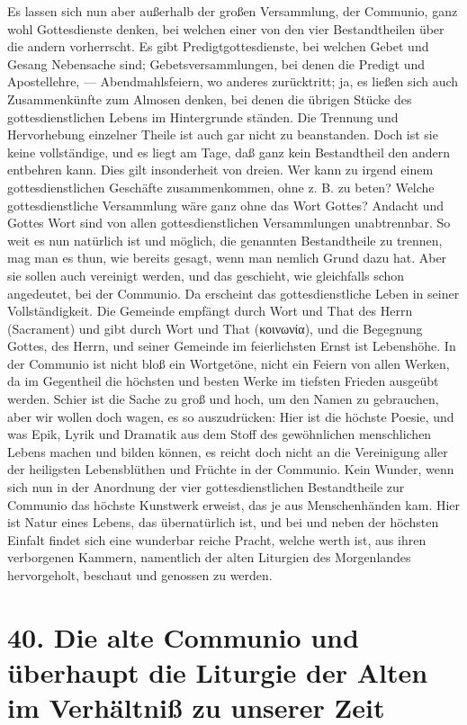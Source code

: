Es lassen sich nun aber außerhalb der großen Versammlung, der Communio, ganz wohl Gottesdienste denken, bei welchen einer von den vier Bestandtheilen über die andern vorherrscht. Es gibt Predigtgottesdienste, bei welchen Gebet
und Gesang Nebensache sind; Gebetsversammlungen, bei denen die Predigt und Apostellehre, — Abendmahlsfeiern, wo anderes zurücktritt; ja, es ließen sich auch Zusammenkünfte zum Almosen denken, bei denen die übrigen Stücke des gottesdienstlichen Lebens im Hintergrunde ständen. Die Trennung und Hervorhebung einzelner Theile ist auch gar nicht zu beanstanden. Doch ist sie keine vollständige, und es liegt am Tage, daß ganz kein Bestandtheil den andern entbehren kann. Dies gilt insonderheit von dreien. Wer kann zu irgend einem gottesdienstlichen Geschäfte zusammenkommen, ohne z. B. zu beten? Welche gottesdienstliche Versammlung wäre ganz ohne das Wort Gottes? Andacht und Gottes Wort sind von allen gottesdienstlichen Versammlungen unabtrennbar. So weit es nun natürlich ist und möglich, die genannten Bestandtheile zu trennen, mag man es thun, wie bereits gesagt, wenn man nemlich Grund dazu hat. Aber sie sollen auch vereinigt werden, und das geschieht, wie gleichfalls schon angedeutet, bei der Communio. Da erscheint das gottesdienstliche Leben in seiner Vollständigkeit. Die Gemeinde empfängt durch Wort und That des Herrn (Sacrament) und gibt durch Wort und That (κοινωνία), und die Begegnung Gottes, des Herrn, und seiner Gemeinde im feierlichsten Ernst ist Lebenshöhe. In der Communio ist nicht bloß ein Wortgetöne, nicht ein Feiern von allen Werken, da im Gegentheil die höchsten und besten Werke im tiefsten Frieden ausgeübt werden. Schier ist die Sache zu groß und hoch, um den Namen zu gebrauchen, aber wir wollen doch wagen, es so auszudrücken: Hier ist die höchste
Poesie, und was Epik, Lyrik und Dramatik aus dem Stoff des gewöhnlichen menschlichen Lebens machen und bilden können, es reicht doch nicht an die Vereinigung aller der heiligsten Lebensblüthen und Früchte in der Communio. Kein Wunder, wenn sich nun in der Anordnung der vier gottesdienstlichen Bestandtheile zur Communio das höchste Kunstwerk erweist, das je aus Menschenhänden kam. Hier ist Natur eines Lebens, das übernatürlich ist, und bei und neben der höchsten Einfalt findet sich eine wunderbar reiche Pracht, welche werth ist, aus ihren verborgenen Kammern, namentlich der alten Liturgien des Morgenlandes hervorgeholt, beschaut und genossen zu werden.

\section[40. Die alte Communio]{40. Die alte Communio und überhaupt die Liturgie der Alten im Verhältniß zu unserer Zeit}

